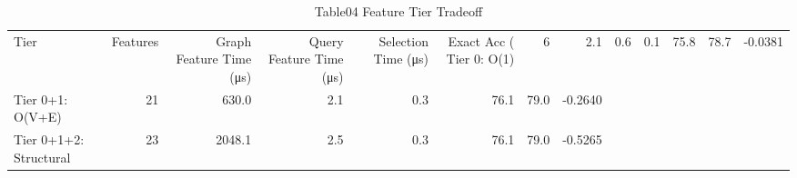 \begin{table}[htbp]
\centering
\caption{Table04 Feature Tier Tradeoff}
\begin{tabular}{lrrrrrrr}
\hline
Tier & Features & Graph Feature Time (μs) & Query Feature Time (μs) & Selection Time (μs) & Exact Acc (%
\hline
Tier 0: O(1) & 6 & 2.1 & 0.6 & 0.1 & 75.8 & 78.7 & -0.0381 \\
Tier 0+1: O(V+E) & 21 & 630.0 & 2.1 & 0.3 & 76.1 & 79.0 & -0.2640 \\
Tier 0+1+2: Structural & 23 & 2048.1 & 2.5 & 0.3 & 76.1 & 79.0 & -0.5265 \\
\hline
\end{tabular}
\end{table}
